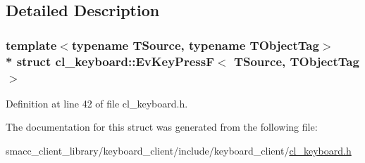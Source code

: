 \subsection{Detailed Description}
\subsubsection*{template$<$typename T\+Source, typename T\+Object\+Tag$>$\\*
struct cl\+\_\+keyboard\+::\+Ev\+Key\+Press\+F$<$ T\+Source, T\+Object\+Tag $>$}



Definition at line 42 of file cl\+\_\+keyboard.\+h.



The documentation for this struct was generated from the following file\+:\begin{DoxyCompactItemize}
\item 
smacc\+\_\+client\+\_\+library/keyboard\+\_\+client/include/keyboard\+\_\+client/\hyperlink{cl__keyboard_8h}{cl\+\_\+keyboard.\+h}\end{DoxyCompactItemize}
